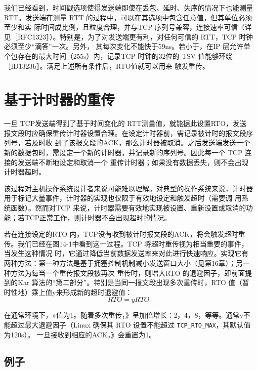 我们已经看到，时间戳选项使得发送端即使在丢包、延时、失序的情况下也能测量RTT。发送端在测量 RTT 的过程中，可以在其选项中包含任意值，但其单位必须至少和实
际时间成比例，且粒度合理，并与TCP 序列号兼容，连接速率可信（详见［RFC1323］）。特别是，为了对发送端更有利，对任何可信的 RTT，TCP 时钟必须至少“滴答”一次。另外，
其每次变化不能快于59ns。若小于，在IP 层允许单个包存在的最大时间（255s）内，记录TCP 时钟的32位的 TSV 值能够环绕［ID1323b］。满足上述所有条件后，RTO值就可以用来
触发重传。

\section{基于计时器的重传}
一旦 TCP发送端得到了基于时间变化的 RTT测量值，就能据此设置RTO，发送报文段时应确保重传计时器设置合理。在设定计时器前，需记录被计时的报文段序列号，若及时收
到了该报文段的ACK，那么计时器被取消。之后发送端发送一个新的数据包时，需设定一个新的计时器，并记录新的序列号。因此每一个 TCP 连接的发送端不断地设定和取消一个
重传计时器；如果没有数据丢失，则不会出现计时器超时。

\begin{tcolorbox}
    该过程对主机操作系统设计者来说可能难以理解。对典型的操作系统来说，计时器用于标记大量事件，计时器的实现也仅限于有效地设定和触发超时（需要调
    用系统函数）。然而对TCP 来说，计时器需要有效地实现被设置、重新设置或取消的功能；若TCP正常工作，则计时器不会出现超时的情况。
\end{tcolorbox}

若在连接设定的RTO 内，TCP没有收到被计时报文段的ACK，将会触发超时重传。我们已经在图14-1中看到这一过程。TCP 将超时重传视为相当重要的事件，当发生这种情况
时，它通过降低当前数据发送率来对此进行快速响应。实现它有两种方法：第一种方法是基于拥塞控制机制减小发送窗口大小（见第16章）；另一种方法为每当一个重传报文段被再次
重传时，则增大RTO 的退避因子，即前面提到的Kar 算法的“第二部分”。特别是当同一报文段出现多次重传时，RTO 值（暂时性地）乘上值y来形成新的超时退避值：
\begin{equation}
RTO = yRTO
\end{equation}

在通常环境下，»值为1。随着多次重传，》呈加倍增长：2，4，8，等等。通常y不能超过最大退避因子（Linux 确保其 RTO 设置不能超过 \verb|TCP_RTO_MAX|，其默认值为120s）。
一旦接收到相应的ACK，》会重置为1。

\subsection{例子}

